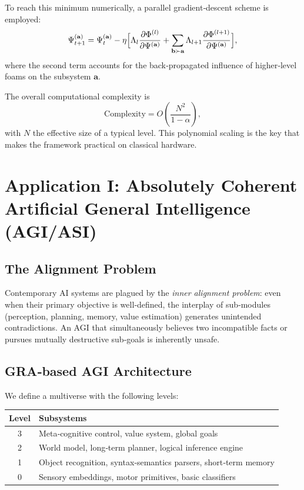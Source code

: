 \documentclass[11pt,a4paper]{article}
\theoremstyle{definition}
\newcommand{\Foam}{\Phi}
\begin{document}
To reach this minimum numerically, a parallel gradient‑descent scheme is employed:
\begin{equation}\label{eq:gradstep}
\Psi^{(\mathbf{a})}_{t+1} = \Psi^{(\mathbf{a})}_t - \eta \Bigl[ \Lambda_l \frac{\partial \Foam^{(l)}}{\partial \Psi^{(\mathbf{a})}} + \sum_{\mathbf{b}\succ\mathbf{a}} \Lambda_{l+1} \frac{\partial \Foam^{(l+1)}}{\partial \Psi^{(\mathbf{a})}} \Bigr],
\end{equation}
where the second term accounts for the back‑propagated influence of higher‑level foams on the subsystem $\mathbf{a}$.

The overall computational complexity is
\begin{equation}\label{eq:complexity}
\text{Complexity} = O\!\left( \frac{N^2}{1-\alpha} \right),
\end{equation}
with $N$ the effective size of a typical level. This polynomial scaling is the key that makes the framework practical on classical hardware.

\section{Application I: Absolutely Coherent Artificial General Intelligence (AGI/ASI)}

\subsection{The Alignment Problem}

Contemporary AI systems are plagued by the \emph{inner alignment problem}: even when their primary objective is well‑defined, the interplay of sub‑modules (perception, planning, memory, value estimation) generates unintended contradictions. An AGI that simultaneously believes two incompatible facts or pursues mutually destructive sub‑goals is inherently unsafe.

\subsection{GRA‑based AGI Architecture}

We define a multiverse with the following levels:
\begin{center}
\begin{tabular}{c|l}
Level & Subsystems \\ \hline
3 & Meta‑cognitive control, value system, global goals \\
2 & World model, long‑term planner, logical inference engine \\
1 & Object recognition, syntax‑semantics parsers, short‑term memory \\
0 & Sensory embeddings, motor primitives, basic classifiers
\end{tabular}
\end{center}
\end{document}
